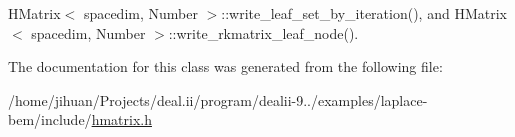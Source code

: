 H\+Matrix$<$ spacedim, Number $>$\+::write\+\_\+leaf\+\_\+set\+\_\+by\+\_\+iteration(), and H\+Matrix$<$ spacedim, Number $>$\+::write\+\_\+rkmatrix\+\_\+leaf\+\_\+node().



The documentation for this class was generated from the following file\+:\begin{DoxyCompactItemize}
\item 
/home/jihuan/\+Projects/deal.\+ii/program/dealii-\/9../examples/laplace-\/bem/include/\hyperlink{hmatrix_8h}{hmatrix.\+h}\end{DoxyCompactItemize}
